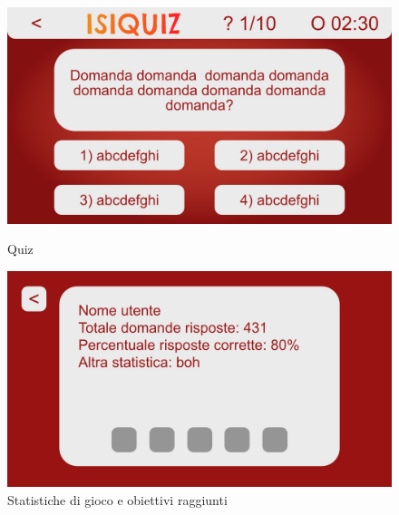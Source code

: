         \begin{figure}[H]
          \centering
          \begin{minipage}[b]{0.48\textwidth}
            \includegraphics[width=\textwidth]{Images/mockup/quiz1.jpg}
            \caption{Quiz}
            \label{fig:Quiz1}
          \end{minipage}
          \hfill
          \begin{minipage}[b]{0.48\textwidth}
            \includegraphics[width=\textwidth]{Images/mockup/achievements1.jpg}
            \caption{Statistiche di gioco e obiettivi raggiunti}
          \end{minipage}
        \end{figure}
          
